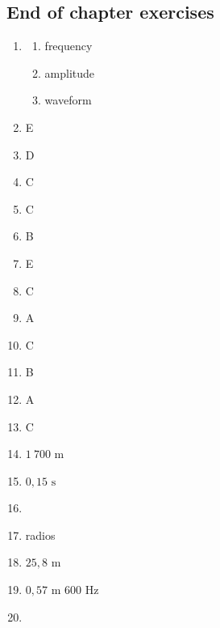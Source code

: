 \subsection{End of chapter exercises} 
\begin{multicols}{5}
  \begin{enumerate}[itemsep=5pt, label=\textbf{\arabic*}. ]
  \item %
    \begin{enumerate}[noitemsep, label=\textbf{(\alph*)} ]
    \item frequency
    \item amplitude
\item waveform
    \end{enumerate}
  \item %
E
  \item %
D
  \item %
C
  \item %
C
  \item %
B
  \item %
E
  \item %
C
  \item %
A
  \item %
C
    \item %
B
    \item %
A
\item %
C
\item %
$1~700 \text{ m}$
\item %
$0,15 \text{ s}$
\item %
\item %
radios
\item %
$25,8 \text{ m}$
\item %
$0,57 \text{ m}$ $600 \text{ Hz}$
\item %

\end{enumerate}
\end{multicols}

